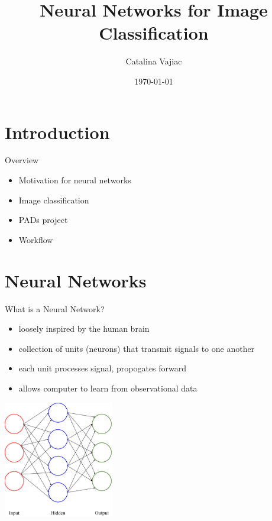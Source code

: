 \documentclass{beamer}
\title{Neural Networks for Image Classification}
\date{\today}
\author{Catalina Vajiac}
\institute{Saint Mary's College}
\begin{document}
  \maketitle

  \section{Introduction}
  \begin{frame}{Overview}
    \begin{itemize}
      \item Motivation for neural networks
      \item Image classification
      \item PADs project
      \item Workflow
    \end{itemize}
  \end{frame}

  \section{Neural Networks}
  \begin{frame}{What is a Neural Network?}
    \begin{itemize}
      \item loosely inspired by the human brain
      \item collection of units (neurons) that transmit signals to one another
      \item each unit processes signal, propogates forward
      \item allows computer to learn from observational data
    \end{itemize}
    \begin{center}
      \includegraphics[height=2in]{../figures/neural_network.eps}
    \end{center}
  \end{frame}
\end{document}
